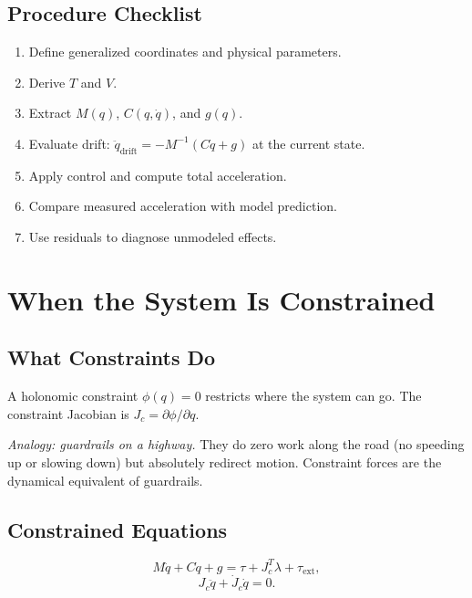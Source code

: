 \documentclass[11pt]{article}
\begin{document}
\subsection{Procedure Checklist}

\begin{enumerate}
\item Define generalized coordinates and physical parameters.
\item Derive $T$ and $V$.
\item Extract $M(q)$, $C(q,\dot{q})$, and $g(q)$.
\item Evaluate drift: $\ddot{q}_{\mathrm{drift}} = -M^{-1}(C\dot{q}+g)$ at the current state.
\item Apply control and compute total acceleration.
\item Compare measured acceleration with model prediction.
\item Use residuals to diagnose unmodeled effects.
\end{enumerate}


\section{When the System Is Constrained}\label{sec:constrained}

\subsection{What Constraints Do}

A holonomic constraint $\phi(q) = 0$ restricts where the system can go. The constraint Jacobian is $J_c = \partial\phi/\partial q$.

\textit{Analogy: guardrails on a highway.} They do zero work along the road (no speeding up or slowing down) but absolutely redirect motion. Constraint forces are the dynamical equivalent of guardrails.

\subsection{Constrained Equations}

\begin{equation}\label{eq:cel-dynamics}
M\ddot{q} + C\dot{q} + g = \tau + J_c^T\lambda + \tau_{\mathrm{ext}},
\end{equation}
\begin{equation}\label{eq:cel-constraint}
J_c\ddot{q} + \dot{J}_c\dot{q} = 0.
\end{equation}
\end{document}
